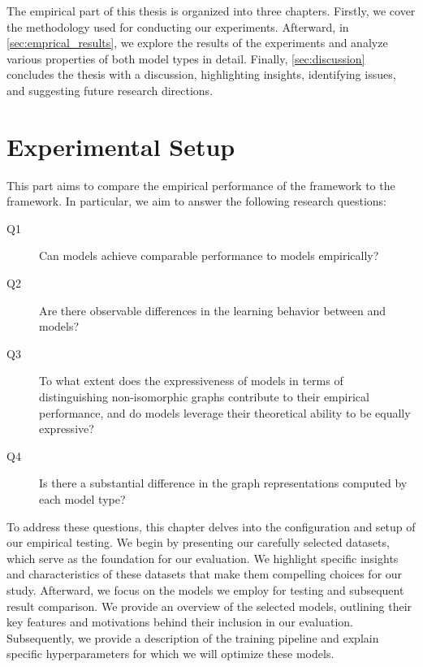 \cleardoubleoddstandardpage

The empirical part of this thesis is organized into three chapters. Firstly, we cover the methodology used for conducting our experiments. Afterward, in \cref{sec:emprical_results}, we explore the results of the experiments and analyze various properties of both model types in detail. Finally, \cref{sec:discussion} concludes the thesis with a discussion, highlighting insights, identifying issues, and suggesting future research directions.

{\let\clearpage\relax
\chapter{Experimental Setup}\label{sec:testing_configuration}}
This part aims to compare the empirical performance of the \wlnn framework to the \gnn framework. In particular, we aim to answer the following research questions:\medskip

\begin{description}
	\item[Q1] Can \wlnn models achieve comparable performance to \gnn models empirically?

	\item[Q2] Are there observable differences in the learning behavior between \wlnn and \gnn models?

	\item[Q3] To what extent does the expressiveness of \wlnn models in terms of distinguishing non-isomorphic graphs contribute to their empirical performance, and do \gnn models leverage their theoretical ability to be equally expressive?
	
	\item[Q4] Is there a substantial difference in the graph representations computed by each model type?
\end{description}

To address these questions, this chapter delves into the configuration and setup of our empirical testing. We begin by presenting our carefully selected datasets, which serve as the foundation for our evaluation. We highlight specific insights and characteristics of these datasets that make them compelling choices for our study. Afterward, we focus on the models we employ for testing and subsequent result comparison. We provide an overview of the selected models, outlining their key features and motivations behind their inclusion in our evaluation. Subsequently, we provide a description of the training pipeline and explain specific hyperparameters for which we will optimize these models.


